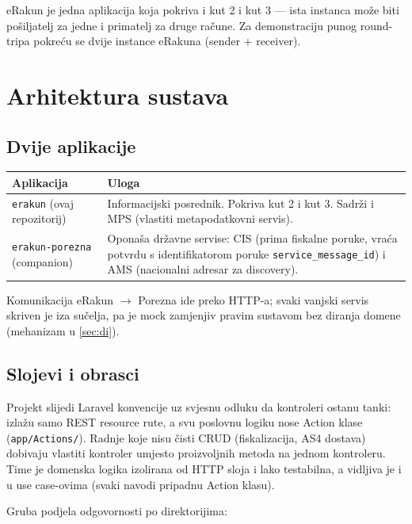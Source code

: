 \documentclass[11pt,a4paper]{article}
\begin{document}
eRakun je jedna aplikacija koja pokriva i kut 2 i kut 3 — ista instanca može biti
pošiljatelj za jedne i primatelj za druge račune. Za demonstraciju punog round-tripa
pokreću se dvije instance eRakuna (sender + receiver).

\section{Arhitektura sustava}

\subsection{Dvije aplikacije}

\begin{tabularx}{\textwidth}{@{}lY@{}}
\toprule
\textbf{Aplikacija} & \textbf{Uloga} \\
\midrule
\texttt{erakun} (ovaj repozitorij) & Informacijski posrednik. Pokriva kut 2 i kut 3. Sadrži i MPS (vlastiti metapodatkovni servis). \\
\texttt{erakun-porezna} (companion) & Oponaša državne servise: CIS (prima fiskalne poruke, vraća potvrdu s identifikatorom poruke \texttt{service\_message\_id}) i AMS (nacionalni adresar za discovery). \\
\bottomrule
\end{tabularx}

Komunikacija eRakun $\rightarrow$ Porezna ide preko HTTP-a; svaki vanjski servis skriven je iza
sučelja, pa je mock zamjenjiv pravim sustavom bez diranja domene (mehanizam u \ref{sec:di}).

\subsection{Slojevi i obrasci}\label{sec:slojevi}

Projekt slijedi Laravel konvencije uz svjesnu odluku da kontroleri ostanu tanki: izlažu
samo REST resource rute, a svu poslovnu logiku nose Action klase (\texttt{app/Actions/}).
Radnje koje nisu čisti CRUD (fiskalizacija, AS4 dostava) dobivaju vlastiti kontroler umjesto
proizvoljnih metoda na jednom kontroleru. Time je domenska logika izolirana od HTTP sloja i
lako testabilna, a vidljiva je i u use case-ovima (svaki navodi pripadnu Action klasu).

Gruba podjela odgovornosti po direktorijima:
\end{document}
